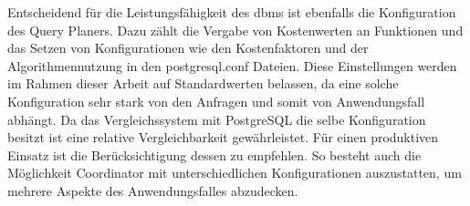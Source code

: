 Entscheidend für die Leistungsfähigkeit des \Gls{dbms} ist ebenfalls die Konfiguration des Query Planers.
Dazu zählt die Vergabe von Kostenwerten an Funktionen und das Setzen von Konfigurationen wie den Kostenfaktoren und der Algorithmennutzung in den postgresql.conf Dateien.
Diese Einstellungen werden im Rahmen dieser Arbeit auf Standardwerten belassen, da eine solche Konfiguration sehr stark von den Anfragen und somit von Anwendungsfall abhängt.
Da das Vergleichssystem mit PostgreSQL die selbe Konfiguration besitzt ist eine relative Vergleichbarkeit gewährleistet.
Für einen produktiven Einsatz ist die Berücksichtigung dessen zu empfehlen.
So besteht auch die Möglichkeit Coordinator mit unterschiedlichen Konfigurationen auszustatten, um mehrere Aspekte des Anwendungsfalles abzudecken.


